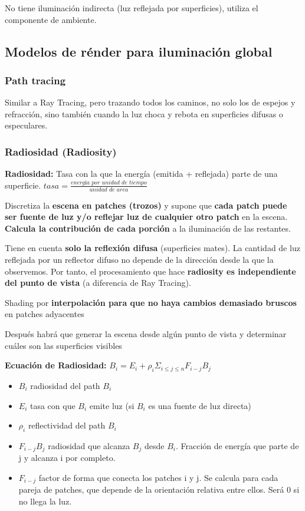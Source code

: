 No tiene iluminación indirecta (luz reflejada por superficies), utiliza el componente de ambiente.

\subsection{Modelos de rénder para iluminación global}
\subsubsection{Path tracing}
Similar a Ray Tracing, pero trazando todos los caminos, no solo los de espejos y refracción, sino también cuando la luz choca y rebota en superficies difusas o especulares.

\subsubsection{Radiosidad (Radiosity)}
\textbf{Radiosidad:} Tasa con la que la energía (emitida + reflejada) parte de una superficie. $\textit{tasa}= \frac{\textit{energía por unidad de tiempo}}{\textit{unidad de area}}$

Discretiza la \textbf{escena en patches (trozos)} y supone que \textbf{cada patch puede ser fuente de luz y/o reflejar luz de cualquier otro patch} en la escena. \textbf{Calcula la contribución de cada porción} a la iluminación de las restantes.

Tiene en cuenta \textbf{solo la reflexión difusa} (superficies mates). La cantidad de luz reflejada por un reflector difuso no depende de la dirección desde la que la observemos. Por tanto, el procesamiento que hace \textbf{radiosity es independiente del punto de vista} (a diferencia de Ray Tracing).

Shading por \textbf{interpolación para que no haya cambios demasiado bruscos} en patches adyacentes

Después habrá que generar la escena desde algún punto de vista y determinar cuáles son las superficies visibles

\textbf{Ecuación de Radiosidad:} $B_i = E_i + \rho_i \Sigma_{i \leq j \leq n} F_{i-j} B_j $
\begin{itemize}
	\item $B_i$ radiosidad del path $B_i$
	\item $E_i$ tasa con que $B_i$ emite luz (si $B_i$ es una fuente de luz directa)
	\item $\rho_i$ reflectividad del path $B_i$
	\item $F_{i-j} B_j$ radiosidad que alcanza $B_j$ desde $B_i$. Fracción de energía que parte de j y alcanza i por completo.
	\item $F_{i-j}$ factor de forma que conecta los patches i y j. Se calcula para cada pareja de patches, que depende de la orientación relativa entre ellos. Será 0 si no llega la luz.
\end{itemize}


